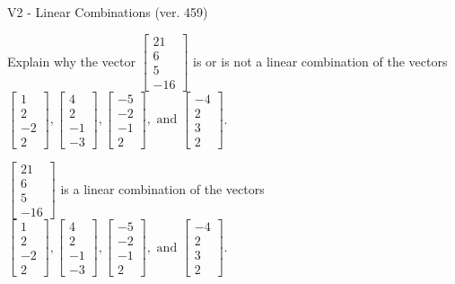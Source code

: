 \begin{exercise}
  \begin{exerciseTitle}V2 - Linear Combinations (ver. 459)\end{exerciseTitle}
  \begin{exerciseStatement}
    Explain why the vector \(\left[\begin{array}{c}
21 \\
6 \\
5 \\
-16
\end{array}\right]\)  is or is not a linear 
	combination of the vectors \(\left[\begin{array}{c}
1 \\
2 \\
-2 \\
2
\end{array}\right] , \left[\begin{array}{c}
4 \\
2 \\
-1 \\
-3
\end{array}\right] , \left[\begin{array}{c}
-5 \\
-2 \\
-1 \\
2
\end{array}\right] , \text{ and } \left[\begin{array}{c}
-4 \\
2 \\
3 \\
2
\end{array}\right]\).
	


  \end{exerciseStatement}
  \begin{exerciseAnswer}
   \(\left[\begin{array}{c}
21 \\
6 \\
5 \\
-16
\end{array}\right]\) 
  	 is  
	a linear combination of the vectors \(\left[\begin{array}{c}
1 \\
2 \\
-2 \\
2
\end{array}\right] , \left[\begin{array}{c}
4 \\
2 \\
-1 \\
-3
\end{array}\right] , \left[\begin{array}{c}
-5 \\
-2 \\
-1 \\
2
\end{array}\right] , \text{ and } \left[\begin{array}{c}
-4 \\
2 \\
3 \\
2
\end{array}\right]\).


\end{exerciseAnswer}
\end{exercise}
